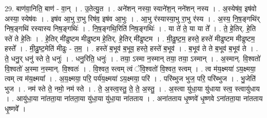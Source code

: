 \documentclass[17pt]{extarticle}
\begin{document}
29. बाण॑वा॒निति॒ बाण॑ - वा॒न् । . उ॒तेत्यु॒त । . अने॑शन् नस्या॒ स्याने॑श॒न् नने॑शन् नस्य । . अ॒स्येष॑व॒ इष॑वो अस्या॒ स्येष॑वः । . इष॑व आ॒भु रा॒भु रिष॑व॒ इष॑व आ॒भुः । . आ॒भु र॑स्यास्या॒भु रा॒भु र॑स्य । . अ॒स्य॒ नि॒ष॒ङ्गथि॑र् निष॒ङ्गथि॑ रस्यास्य निष॒ङ्गथिः॑ । . नि॒ष॒ङ्गथि॒रिति॑ निष॒ङ्गथिः॑ । . या ते॑ ते॒ या या ते᳚ । . ते॒ हे॒तिर्. हे॒ति स्ते॑ ते हे॒तिः । . हे॒तिर् मी॑ढुष्टम मीढुष्टम हे॒तिर्. हे॒तिर् मी॑ढुष्टम । . मी॒ढु॒ष्ट॒म॒ हस्ते॒ हस्ते॑ मीढुष्टम मीढुष्टम॒ हस्ते᳚ । . मी॒ढु॒ष्ट॒मेति॑ मीढुः - त॒म॒ । . हस्ते॑ ब॒भूव॑ ब॒भूव॒ हस्ते॒ हस्ते॑ ब॒भूव॑ । . ब॒भूव॑ ते ते ब॒भूव॑ ब॒भूव॑ ते । . ते॒ धनु॒र् धनु॑ स्ते ते॒ धनुः॑ । . धनु॒रिति॒ धनुः॑ । . तया॒ ऽस्मा न॒स्मान् तया॒ तया॒ ऽस्मान् । . अ॒स्मान्. वि॒श्वतो॑ वि॒श्वतो॑ अ॒स्मा न॒स्मान्. वि॒श्वतः॑ । . वि॒श्वत॒ स्त्वम् त्वं ॅवि॒श्वतो॑ वि॒श्वत॒ स्त्वम् । . त्व म॑य॒क्ष्मया॑ ऽय॒क्ष्मया॒ त्वम् त्व म॑य॒क्ष्मया᳚ । . अ॒य॒क्ष्मया॒ परि॒ पर्य॑य॒क्ष्मया॑ ऽय॒क्ष्मया॒ परि॑ । . परि॑ब्भुज भुज॒ परि॒ परि॑ब्भुज । . भु॒जेति॑ भुज । . नम॑ स्ते ते॒ नमो॒ नम॑ स्ते । . ते॒ अ॒स्त्व॒स्तु॒ ते॒ ते॒ अ॒स्तु॒ । . अ॒स्त्वा यु॑धा॒या यु॑धाया स्त्व॒ स्त्वायु॑धाय । . आयु॑धा॒या ना॑तता॒या ना॑तता॒या यु॑धा॒या यु॑धा॒या ना॑तताय । . अना॑तताय धृ॒ष्णवे॑ धृ॒ष्णवे ऽना॑तता॒या ना॑तताय धृ॒ष्णवे᳚ । \newline
\end{document}
